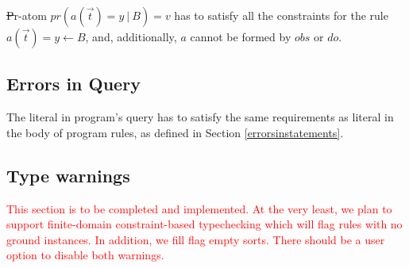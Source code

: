 \documentclass[12pt, letterpaper]{article}
\begin{document}
\st
Pr-atom $pr(a(\vec{t}) = y~|~B ) = v$ has to satisfy all the constraints for the rule $a(\vec{t}) = y \leftarrow B$, and, additionally, $a$ cannot be formed by $obs$ or $do$.

\subsection{Errors in Query}
The literal in program's query has to satisfy the same requirements as literal in the body of program rules, as defined in Section \ref{errorsinstatements}.


\subsection{Type warnings}\label{type_warnings}

\textcolor{red}{This section is to be completed and implemented. At the very least, we plan to support
  finite-domain constraint-based typechecking which will flag rules with no ground instances. In addition, we fill flag empty sorts. There should be a user option to disable both warnings.}



\end{document}
